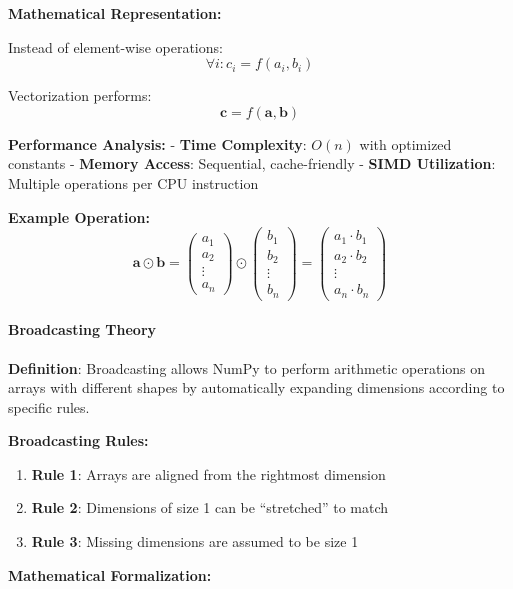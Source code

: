 \documentclass[11pt]{article}
\providecommand{\tightlist}{%
      \setlength{\itemsep}{0pt}\setlength{\parskip}{0pt}}
\begin{document}
\textbf{Mathematical Representation:}

Instead of element-wise operations: \[\forall i: c_i = f(a_i, b_i)\]

Vectorization performs: \[\mathbf{c} = f(\mathbf{a}, \mathbf{b})\]

\textbf{Performance Analysis:} - \textbf{Time Complexity}: \(O(n)\) with
optimized constants - \textbf{Memory Access}: Sequential, cache-friendly
- \textbf{SIMD Utilization}: Multiple operations per CPU instruction

\textbf{Example Operation:}
\[\mathbf{a} \odot \mathbf{b} = \begin{pmatrix} a_1 \\ a_2 \\ \vdots \\ a_n \end{pmatrix} \odot \begin{pmatrix} b_1 \\ b_2 \\ \vdots \\ b_n \end{pmatrix} = \begin{pmatrix} a_1 \cdot b_1 \\ a_2 \cdot b_2 \\ \vdots \\ a_n \cdot b_n \end{pmatrix}\]

\paragraph{Broadcasting Theory}\label{broadcasting-theory}

\textbf{Definition}: Broadcasting allows NumPy to perform arithmetic
operations on arrays with different shapes by automatically expanding
dimensions according to specific rules.

\textbf{Broadcasting Rules:}

\begin{enumerate}
\def\labelenumi{\arabic{enumi}.}
\tightlist
\item
  \textbf{Rule 1}: Arrays are aligned from the rightmost dimension
\item
  \textbf{Rule 2}: Dimensions of size 1 can be ``stretched'' to match
\item
  \textbf{Rule 3}: Missing dimensions are assumed to be size 1
\end{enumerate}

\textbf{Mathematical Formalization:}
\end{document}
